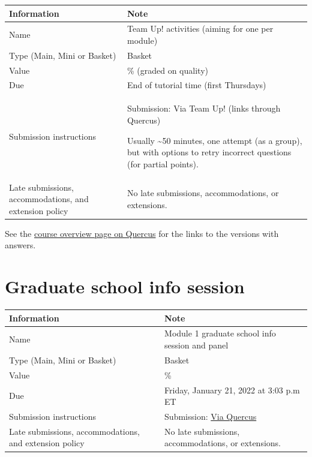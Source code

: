 \documentclass[
  openany]{book}
\begin{document}
\begin{longtable}[]{@{}
  >{\raggedright\arraybackslash}p{}
  >{\raggedright\arraybackslash}p{}@{}}
\toprule
\textbf{Information} & \textbf{Note} \\
\midrule
\endhead
Name & Team Up! activities (aiming for one per module) \\
Type (Main, Mini or Basket) & Basket \\
Value & 0.5\% (graded on quality) \\
Due & End of tutorial time (first Thursdays) \\
Submission instructions & Submission: Via Team Up! (links through Quercus)

Usually \textasciitilde50 minutes, one attempt (as a group), but with options to retry incorrect questions (for partial points). \\
Late submissions, accommodations, and extension policy & No late submissions, accommodations, or extensions. \\
\bottomrule
\end{longtable}

See the \href{https://q.utoronto.ca/courses/253305/pages/course-overview}{course overview page on Quercus} for the links to the versions with answers.

\hypertarget{graduate-school-info-session}{%
\section{Graduate school info session}\label{graduate-school-info-session}}

\begin{longtable}[]{@{}
  >{\raggedright\arraybackslash}p{}
  >{\raggedright\arraybackslash}p{}@{}}
\toprule
\textbf{Information} & \textbf{Note} \\
\midrule
\endhead
Name & Module 1 graduate school info session and panel \\
Type (Main, Mini or Basket) & Basket \\
Value & 0.1\% \\
Due & Friday, January 21, 2022 at 3:03 p.m ET \\
Submission instructions & Submission: \href{https://q.utoronto.ca/courses/253305/quizzes/239864}{Via Quercus} \\
Late submissions, accommodations, and extension policy & No late submissions, accommodations, or extensions. \\
\bottomrule
\end{longtable}
\end{document}

